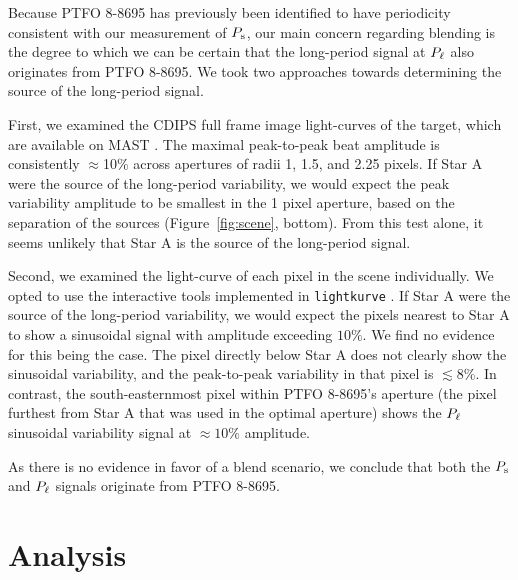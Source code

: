 \documentclass[12pt,twocolumn,tighten]{aastex62}
\begin{document}
Because PTFO 8-8695 has previously been identified to have periodicity
consistent with our measurement of $P_{\rm s}$, our main concern
regarding blending is the degree to which we can be certain that the
long-period signal at $P_{\rm \ell}$ also originates from PTFO 8-8695.
We took two approaches towards determining the source of the long-period signal.

First, we examined the CDIPS full frame image light-curves of the
target, which are available on MAST \citep{bouma_cluster_2019}.
The maximal peak-to-peak beat amplitude is consistently $\approx$10\%
across apertures of radii 1, 1.5, and 2.25 pixels.
If Star A were the source of the long-period variability, we would expect the
peak variability amplitude to be smallest in the 1 pixel aperture, based on the
separation of the sources (Figure~\ref{fig:scene}, bottom).
From this test alone, it seems unlikely that Star A is the source of
the long-period signal.

Second, we examined the light-curve of each pixel in the scene
individually.  We opted to use the
interactive tools implemented in
\texttt{lightkurve} \citep{lightkurve_2018}.  If Star A were the
source of the long-period variability, we would expect the pixels
nearest to Star A to show a sinusoidal signal with
amplitude exceeding $10\%$.  We find no evidence for
this being the case.  The pixel directly below Star A does not
clearly show the sinusoidal variability, and the peak-to-peak 
variability in that pixel is $\lesssim 8\%$.  In contrast, the
south-easternmost pixel within PTFO 8-8695's aperture (the pixel 
furthest from Star A that was used in the optimal aperture) shows the $P_{\rm \ell}$ sinusoidal
variability signal at $\approx 10\%$ amplitude.

As there is no evidence in favor of a blend scenario, we
conclude that both the $P_{\rm s}$ and $P_{\rm \ell}$ signals originate from PTFO 8-8695.


\section{Analysis}
\label{sec:analysis}
\end{document}
